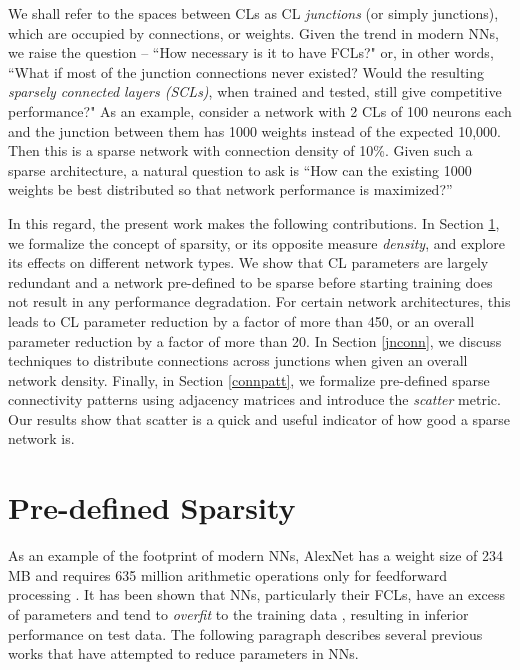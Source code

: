\documentclass[conference]{IEEEtran}
\begin{document}
We shall refer to the spaces between CLs as CL \emph{junctions} (or simply junctions), which are occupied by connections, or weights. Given the trend in modern NNs, we raise the question -- ``How necessary is it to have FCLs?" or, in other words, ``What if most of the junction connections never existed? Would the resulting \emph{sparsely connected layers (SCLs)}, when trained and tested, still give competitive performance?"  %
As an example, consider a network with 2 CLs of 100 neurons each and the junction between them has 1000 weights instead of the expected 10,000. Then this is a sparse network with connection density of 10\%.  Given such a sparse architecture, a natural question to ask is ``How can the existing 1000 weights be best distributed so that network performance is maximized?'' %

In this regard, the present work makes the following contributions. In Section \ref{sparsity}, we formalize the concept of sparsity, or its opposite measure \emph{density}, and explore its effects on different network types. We show that CL parameters are largely redundant and a network pre-defined to be sparse before starting training does not result in any performance degradation. For certain network architectures, this leads to CL parameter reduction by a factor of more than 450, or an overall parameter reduction by a factor of more than 20.  %
In Section \ref{jnconn}, we discuss techniques to distribute connections across junctions when given an overall network density. %
Finally, in Section \ref{connpatt}, we formalize pre-defined sparse connectivity patterns using adjacency matrices and introduce the \emph{scatter} metric. Our results show that scatter is a quick and useful indicator of how good a sparse network is.%

\section{Pre-defined Sparsity}\label{sparsity}
As an example of the footprint of modern NNs, AlexNet has a weight size of 234 MB and requires 635 million arithmetic operations only for feedforward processing \cite{Zhang2016}. It has been shown that NNs, particularly their FCLs, have an excess of parameters and tend to \emph{overfit} to the training data \cite{Denil2013}, resulting in inferior performance on test data. The following paragraph describes several previous works that have attempted to reduce parameters in NNs.
\end{document}

